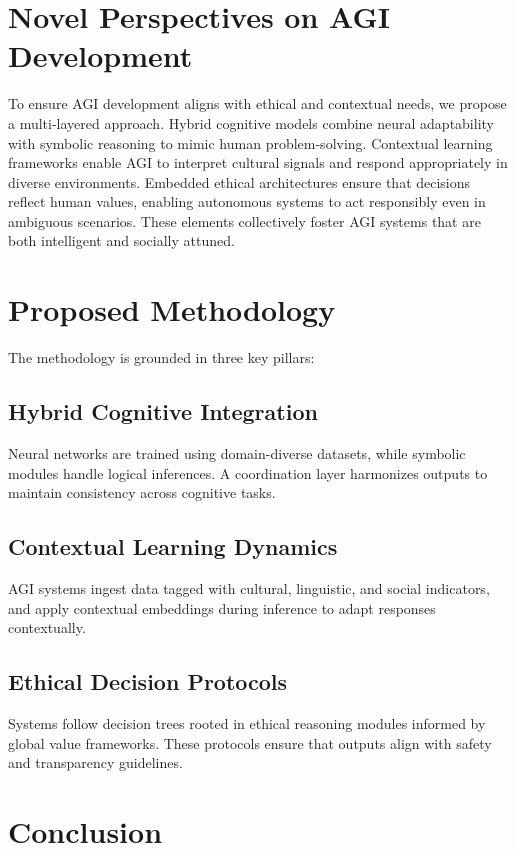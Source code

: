 \documentclass[12pt]{article}
\begin{document}
\section*{Novel Perspectives on AGI Development}

To ensure AGI development aligns with ethical and contextual needs, we propose a multi-layered approach. Hybrid cognitive models combine neural adaptability with symbolic reasoning to mimic human problem-solving. Contextual learning frameworks enable AGI to interpret cultural signals and respond appropriately in diverse environments. Embedded ethical architectures ensure that decisions reflect human values, enabling autonomous systems to act responsibly even in ambiguous scenarios. These elements collectively foster AGI systems that are both intelligent and socially attuned.

\section*{Proposed Methodology}

The methodology is grounded in three key pillars:

\subsection*{Hybrid Cognitive Integration}
Neural networks are trained using domain-diverse datasets, while symbolic modules handle logical inferences. A coordination layer harmonizes outputs to maintain consistency across cognitive tasks.

\subsection*{Contextual Learning Dynamics}
AGI systems ingest data tagged with cultural, linguistic, and social indicators, and apply contextual embeddings during inference to adapt responses contextually.

\subsection*{Ethical Decision Protocols}
Systems follow decision trees rooted in ethical reasoning modules informed by global value frameworks. These protocols ensure that outputs align with safety and transparency guidelines.

\section*{Conclusion}
\end{document}
